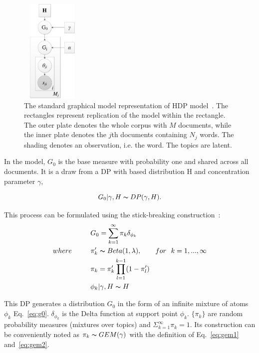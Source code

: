 \begin{figure}[!htbp]
	\center
	\includegraphics[width=3cm, height = 5cm]{figures/HDP_standard_graph-crop.pdf}
	\caption[The standard graphical model representation of HDP model]
	{The standard graphical model representation of HDP model~\cite{teh2006hdp}. The rectangles represent replication of the model within the rectangle. The outer plate denotes the whole corpus with $M$ documents, while the inner plate denotes the $j$th documents containing $N_j$ words. The shading denotes an observation, i.e. the word. The topics are latent.}
	\label{fig:hdp_graph}
\end{figure}

In the model, $G_0$ is the base measure with probability one and shared across all documents. It is a draw from a DP with based distribution H and concentration parameter $\gamma$,

\begin{equation*}
	G_0|\gamma,H \thicksim DP(\gamma,H).
\end{equation*}

This process can be formulated using the stick-breaking construction~\cite{teh2006hdp}:
\begin{align}
	\label{eq:g0}
	&G_0 = \sum^\infty_{k=1}\pi _k\delta_{\phi_k}\\
	\label{eq:gem1}
	where~~~~~~~~&\pi_k'\thicksim Beta(1,\lambda),~~~~~~for~~k=1,...,\infty \\
	\label{eq:gem2}
	&\pi_k =\pi _k'\prod^{k-1}_{l=1}(1-\pi _l')\\ 
	&\phi_k|\gamma,H \thicksim H
	\label{eq:phi_k}
\end{align}

This DP generates a distribution $G_0$ in the form of an infinite mixture of atoms $\phi_k$ Eq.~\eqref{eq:g0}. $\delta_{\phi_k}$ is the Delta function at support point $\phi_k$. $\{\pi_k\}$ are random probability measures (mixtures over topics) and $\Sigma_{k=1}^\infty \pi_k=1$. Its construction can be conveniently noted as $\pi_k \thicksim GEM(\gamma)$ with the definition of Eq.~\eqref{eq:gem1} and~\eqref{eq:gem2}.


